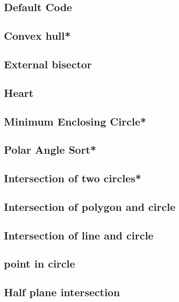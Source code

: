 \subsection{Default Code}

\subsection{Convex hull*} %

\subsection{External bisector}

\subsection{Heart}

\subsection{Minimum Enclosing Circle*} %

\subsection{Polar Angle Sort*} %

\subsection{Intersection of two circles*} %

\subsection{Intersection of polygon and circle}

\subsection{Intersection of line and circle}

\subsection{point in circle}

\subsection{Half plane intersection}

